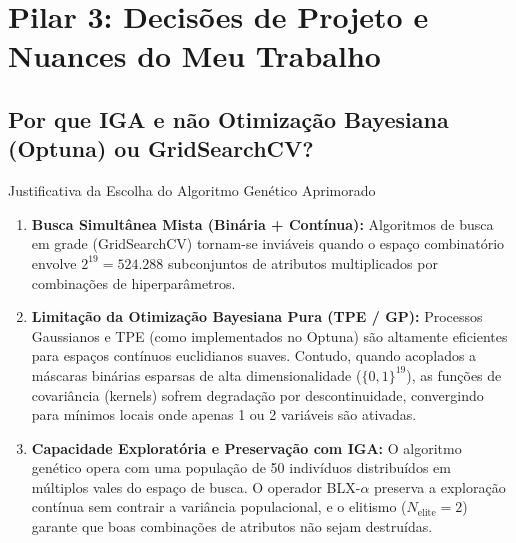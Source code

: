 \documentclass[11pt,a4paper]{article}
\begin{document}
\vspace{0.4cm}
\section{Pilar 3: Decisões de Projeto e Nuances do Meu Trabalho}

\subsection{Por que IGA e não Otimização Bayesiana (Optuna) ou GridSearchCV?}
\begin{decisionBox}{Justificativa da Escolha do Algoritmo Genético Aprimorado}
\begin{enumerate}[leftmargin=0.8cm]
  \item \textbf{Busca Simultânea Mista (Binária + Contínua):} Algoritmos de busca em grade (GridSearchCV) tornam-se inviáveis quando o espaço combinatório envolve $2^{19} = 524.288$ subconjuntos de atributos multiplicados por combinações de hiperparâmetros.
  \item \textbf{Limitação da Otimização Bayesiana Pura (TPE / GP):} Processos Gaussianos e TPE (como implementados no Optuna) são altamente eficientes para espaços contínuos euclidianos suaves. Contudo, quando acoplados a máscaras binárias esparsas de alta dimensionalidade ($\{0, 1\}^{19}$), as funções de covariância (kernels) sofrem degradação por descontinuidade, convergindo para mínimos locais onde apenas 1 ou 2 variáveis são ativadas.
  \item \textbf{Capacidade Exploratória e Preservação com IGA:} O algoritmo genético opera com uma população de 50 indivíduos distribuídos em múltiplos vales do espaço de busca. O operador BLX-$\alpha$ preserva a exploração contínua sem contrair a variância populacional, e o elitismo ($N_{\text{elite}} = 2$) garante que boas combinações de atributos não sejam destruídas.
\end{enumerate}
\end{decisionBox}
\end{document}
